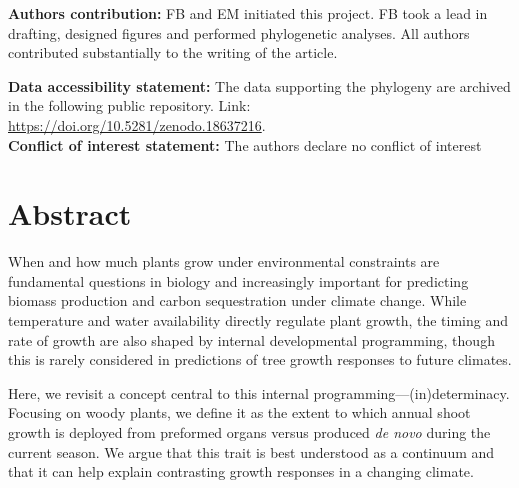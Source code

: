 \documentclass{article}
\begin{document}
\textbf{Authors contribution:}
	FB and EM initiated this project. FB took a lead in drafting, designed figures and performed phylogenetic analyses. All authors contributed substantially to the writing of the article.
	
	\textbf{Data accessibility statement:}
	The data supporting the phylogeny are archived in the following public repository. Link: \href{https://doi.org/10.5281/zenodo.18637216}{https://doi.org/10.5281/zenodo.18637216}.\\
	\textbf{Conflict of interest statement:}
	The authors declare no conflict of interest
	
	
	

	
\section*{Abstract} %

When and how much plants grow under environmental constraints are fundamental questions in biology and increasingly important for predicting biomass production and carbon sequestration under climate change. While temperature and water availability directly regulate plant growth, the timing and rate of growth are also shaped by internal developmental programming, though this is rarely considered in predictions of tree growth responses to future climates.

Here, we revisit a concept central to this internal programming---(in)determinacy. Focusing on woody plants, we define it as the extent to which annual shoot growth is deployed from preformed organs versus produced \textit{de novo} during the current season. We argue that this trait is best understood as a continuum and that it can help explain contrasting growth responses in a changing climate.
\end{document}
